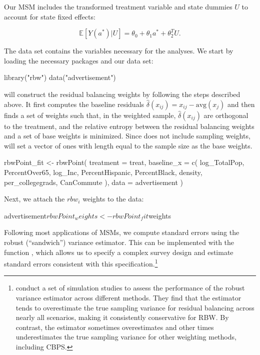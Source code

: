 Our MSM includes the transformed treatment variable and state dummies
\(U\) to account for state fixed effects:

\begin{equation}
\label{eq:12}
\mathbb{E}[Y(a^{*})|U]=\theta_{0}+\theta_{1}a^{*} +\theta_{2}^{T}U.
\end{equation}

The data set  contains the variables necessary for
the analyses. We start by loading the necessary packages and our data
set:

\begin{Schunk}
\begin{Sinput}
library("rbw")
data("advertisement")
\end{Sinput}
\end{Schunk}

 will construct the residual balancing weights by
following the steps described above. It first computes the baseline
residuals \(\hat{\delta}(x_{ij})=x_{ij}-\text{avg}({x}_{j})\) and then
finds a set of weights such that, in the weighted sample,
\(\hat{\delta}(x_{ij})\) are orthogonal to the treatment, and the
relative entropy between the residual balancing weights and a set of
base weights is minimized. Since  does not include
sampling weights,  will set a vector of ones with
length equal to the sample size as the base weights.

\begin{Schunk}
\begin{Sinput}
rbwPoint_fit <-
  rbwPoint(
    treatment = treat,
    baseline_x = c(
      log_TotalPop,
      PercentOver65,
      log_Inc,
      PercentHispanic,
      PercentBlack,
      density,
      per_collegegrads,
      CanCommute
    ),
    data =
      advertisement
  )
\end{Sinput}
\end{Schunk}

Next, we attach the \(rbw_{i}\) weights to the data:

\begin{Schunk}
\begin{Sinput}
advertisement$rbwPoint_weights <- rbwPoint_fit$weights
\end{Sinput}
\end{Schunk}

Following most applications of MSMs, we compute standard errors using
the robust (``sandwich'') variance estimator. This can be implemented
with the function , which allows us to specify
a complex survey design and estimate standard errors consistent with
this specification.\footnote{\citet{zhouResidualBalancingMethod2020a}
  conduct a set of simulation studies to assess the performance of the
  robust variance estimator across different methods. They find that the
  estimator tends to overestimate the true sampling variance for
  residual balancing across nearly all scenarios, making it consistently
  conservative for RBW. By contrast, the estimator sometimes
  overestimates and other times underestimates the true sampling
  variance for other weighting methods, including CBPS.}

